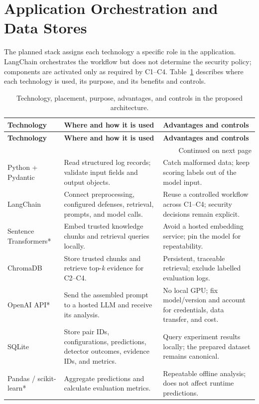 \section{Application Orchestration and Data Stores}
\label{application-orchestration-and-data-stores}

The planned stack assigns each technology a specific role in the
application. LangChain orchestrates the workflow but does not determine
the security policy; components are activated only as required by
C1--C4. Table~\ref{tab:system-components} describes where each technology
is used, its purpose, and its benefits and controls.

{\footnotesize
\setlength{\tabcolsep}{3pt}
\renewcommand{\arraystretch}{1.08}
\begin{longtable}{@{}p{}p{}p{}@{}}
\caption{Technology, placement, purpose, advantages, and controls in the proposed architecture.}
\label{tab:system-components}\\
\toprule
\textbf{Technology} & \textbf{Where and how it is used} & \textbf{Advantages and controls} \\
\midrule
\endfirsthead
\toprule
\textbf{Technology} & \textbf{Where and how it is used} & \textbf{Advantages and controls} \\
\midrule
\endhead
\midrule
\multicolumn{3}{r}{Continued on next page}\\
\endfoot
\bottomrule
\endlastfoot
Python + Pydantic & Read structured log records; validate input fields and output objects. & Catch malformed data; keep scoring labels out of the model input. \\
LangChain & Connect preprocessing, configured defenses, retrieval, prompts, and model calls. & Reuse a controlled workflow across C1--C4; security decisions remain explicit. \\
Sentence Transformers* & Embed trusted knowledge chunks and retrieval queries locally. & Avoid a hosted embedding service; pin the model for repeatability. \\
ChromaDB & Store trusted chunks and retrieve top-\emph{k} evidence for C2--C4. & Persistent, traceable retrieval; exclude labelled evaluation logs. \\
OpenAI API* & Send the assembled prompt to a hosted LLM and receive its analysis. & No local GPU; fix model/version and account for credentials, data transfer, and cost. \\
SQLite & Store pair IDs, configurations, predictions, detector outcomes, evidence IDs, and metrics. & Query experiment results locally; the prepared dataset remains canonical. \\
Pandas / scikit-learn* & Aggregate predictions and calculate evaluation metrics. & Repeatable offline analysis; does not affect runtime predictions. \\
\end{longtable}
}

